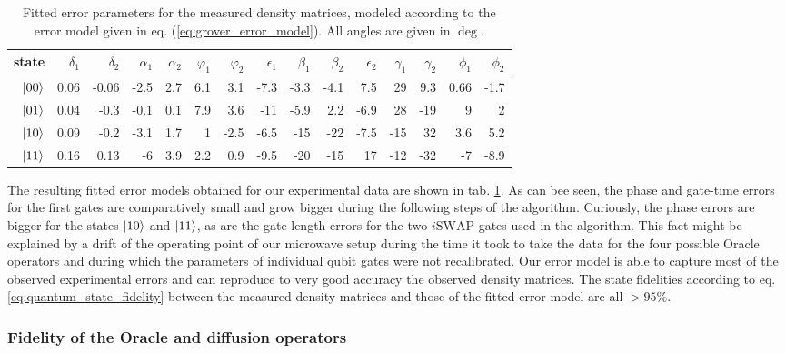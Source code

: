 \begin{table}[ht!]
\centering
\footnotesize{
\begin{tabular}{r|rrrrrrrrrrrrrr}
state & $\delta_1$ & $\delta_2$ & $\alpha_1$ & $\alpha_2$ & $\varphi_1$ & $\varphi_2$ & $\epsilon_1$ & $\beta_1$ & $\beta_2$ & $\epsilon_2$ & $\gamma_1$ & $\gamma_2$ & $\phi_1$ & $\phi_2$ \\ \hline
$\left| 00 \right>$ & 0.06 & -0.06 & -2.5 & 2.7 & 6.1 & 3.1 & -7.3 & -3.3 & -4.1 & 7.5 & 29 & 9.3 & 0.66 & -1.7
 \\
$\left| 01 \right>$ & 0.04 & -0.3 & -0.1 & 0.1 & 7.9 & 3.6 & -11 & -5.9 & 2.2 & -6.9 & 28 & -19 &  9 &  2
 \\
$\left| 10 \right>$ & 0.09 & -0.2 & -3.1 & 1.7 &  1 & -2.5 & -6.5 & -15 & -22 & -7.5 & -15 & 32 & 3.6 & 5.2
\\
$\left| 11 \right>$ & 0.16 & 0.13 & -6 & 3.9 & 2.2 & 0.9 & -9.5 & -20 & -15 & 17 & -12 & -32 & -7 & -8.9
\end{tabular}
}
\caption[Fitted gate error parameters of the Grover algorithm]{Fitted error parameters for the measured density matrices, modeled according to the error model given in eq. (\ref{eq:grover_error_model}). All angles are given in $\deg$.}
\label{tab:grover_error_parameters}
\end{table}

The resulting fitted error models obtained for our experimental data are shown in tab. \ref{tab:grover_error_parameters}. As can bee seen, the phase and gate-time errors for the first gates are comparatively small and grow bigger during the following steps of the algorithm. Curiously, the phase errors are bigger for the states $\left| 10 \right>$ and $\left| 11 \right>$, as are the gate-length errors for the two $i\mathrm{SWAP}$ gates used in the algorithm. This fact might be explained by a drift of the operating point of our microwave setup during the time it took to take the data for the four possible Oracle operators and during which the parameters of individual qubit gates were not recalibrated. Our error model is able to capture most of the observed experimental errors and can reproduce to very good accuracy the observed density matrices. The state fidelities according to eq. \ref{eq:quantum_state_fidelity} between the measured density matrices and those of the fitted error model are all $>95\%$.

\subsubsection{Fidelity of the Oracle and diffusion operators}

